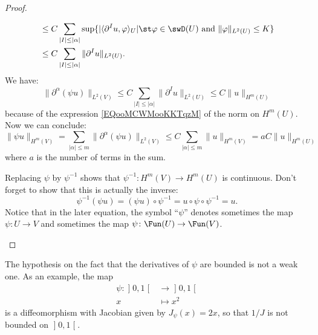 \begin{proof}
\begin{subproof}
\begin{subequations}
\begin{align}
				                                         & \leq C\sum_{| I |\leq | \alpha |} \sup\{ |\langle \partial^Iu, \varphi\rangle_U|\st \varphi\in\swD(U)\text{ and }\| \varphi \|_{L^2(U)}\leq K  \} \\
				                                         & \leq C\sum_{| I |\leq | \alpha |}\| \partial^Iu \|_{L^2(U)}.
			\end{align}
		\end{subequations}
		We have:
		\begin{equation}
			\| \partial^{\alpha}(\psi u) \|_{L^2(V)}\leq C\sum_{| I |\leq | \alpha |}\| \partial^Iu \|_{L^2(U)}\leq C\| u \|_{H^m(U)}
		\end{equation}
		because of the expression \eqref{EQooMCWMooKKTqzM} of the norm on \( H^m(U)\). Now we can conclude:
		\begin{equation}
			\| \psi u \|_{H^m(V)}=\sum_{| \alpha |\leq m}\| \partial^{\alpha}(\psi u) \|_{L^2(V)}\leq C\sum_{| \alpha |\leq m}\| u \|_{H^m(V)} = a C\| u  \|_{H^m(U)}
		\end{equation}
		where \( a\) is the number of terms in the sum.


		Replacing \( \psi\) by \( \psi^{-1}\) shows that \( \psi^{-1}\colon H^m(V)\to H^m(U)\) is continuous. Don't forget to show that this is actually the inverse:
		\begin{equation}
			\psi^{-1}(\psi u)=(\psi u)\circ \psi^{-1}=u\circ\psi\circ\psi^{-1}=u.
		\end{equation}
		Notice that in the later equation, the symbol ``$\psi$'' denotes sometimes the map \( \psi\colon U\to V\) and sometimes the map \( \psi\colon \Fun(U)\to \Fun(V)\).
	\end{subproof}
\end{proof}

\begin{remark}
	The hypothesis on the fact that the derivatives of \( \psi\) are bounded is not a weak one. As an example, the map
	\begin{equation}
		\begin{aligned}
			\psi\colon \mathopen] 0 , 1 \mathclose[ & \to \mathopen] 0 , 1 \mathclose[ \\
			x                                       & \mapsto x^2
		\end{aligned}
	\end{equation}
	is a diffeomorphism with Jacobian given by \( J_{\psi}(x)=2x\), so that \( 1/J\) is not bounded on \( \mathopen] 0 , 1 \mathclose[\).
\end{remark}

